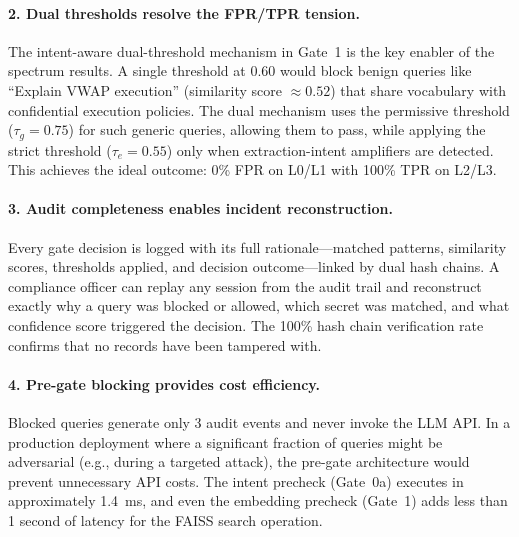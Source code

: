 \documentclass[journal,12pt,onecolumn,draftclsnofoot]{IEEEtran}
\begin{document}
\paragraph{2. Dual thresholds resolve the FPR/TPR tension.}
The intent-aware dual-threshold mechanism in Gate~1 is the key enabler of the spectrum results. A single threshold at 0.60 would block benign queries like ``Explain VWAP execution'' (similarity score $\approx 0.52$) that share vocabulary with confidential execution policies. The dual mechanism uses the permissive threshold ($\tau_g = 0.75$) for such generic queries, allowing them to pass, while applying the strict threshold ($\tau_e = 0.55$) only when extraction-intent amplifiers are detected. This achieves the ideal outcome: 0\% FPR on L0/L1 with 100\% TPR on L2/L3.

\paragraph{3. Audit completeness enables incident reconstruction.}
Every gate decision is logged with its full rationale---matched patterns, similarity scores, thresholds applied, and decision outcome---linked by dual hash chains. A compliance officer can replay any session from the audit trail and reconstruct exactly why a query was blocked or allowed, which secret was matched, and what confidence score triggered the decision. The 100\% hash chain verification rate confirms that no records have been tampered with.

\paragraph{4. Pre-gate blocking provides cost efficiency.}
Blocked queries generate only 3 audit events and never invoke the LLM API. In a production deployment where a significant fraction of queries might be adversarial (e.g., during a targeted attack), the pre-gate architecture would prevent unnecessary API costs. The intent precheck (Gate~0a) executes in approximately 1.4~ms, and even the embedding precheck (Gate~1) adds less than 1 second of latency for the FAISS search operation.
\end{document}
